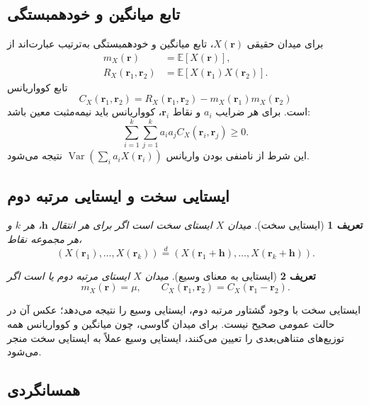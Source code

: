 \documentclass[12pt,openany,oneside]{book}
\newtheorem{definition}{تعریف}[chapter]
\newcommand{\E}{\mathbb{E}}
\newcommand{\Var}{\operatorname{Var}}
\newcommand{\vect}[1]{\bm{#1}}
\begin{document}
\subsection{تابع میانگین و خودهمبستگی}

برای میدان حقیقی \(X(\vect{r})\)، تابع میانگین و خودهمبستگی به‌ترتیب عبارت‌اند از
\begin{align}
 m_X(\vect{r})&=\E[X(\vect{r})],\\
 R_X(\vect{r}_1,\vect{r}_2)&=\E[X(\vect{r}_1)X(\vect{r}_2)].
\end{align}
تابع کوواریانس
\begin{equation}
 C_X(\vect{r}_1,\vect{r}_2)
 =R_X(\vect{r}_1,\vect{r}_2)-m_X(\vect{r}_1)m_X(\vect{r}_2)
\end{equation}
است. برای هر ضرایب \(a_i\) و نقاط \(\vect{r}_i\)، کوواریانس باید نیمه‌مثبت معین باشد:
\begin{equation}
\sum_{i=1}^{k}\sum_{j=1}^{k}a_i a_j C_X(\vect{r}_i,\vect{r}_j)\ge 0.
\end{equation}
این شرط از نامنفی بودن واریانس \(\Var(\sum_i a_iX(\vect{r}_i))\) نتیجه می‌شود.

\subsection{ایستایی سخت و ایستایی مرتبه دوم}

\begin{definition}[ایستایی سخت]
میدان \(X\) ایستای سخت است اگر برای هر انتقال \(\vect{h}\)، هر \(k\) و هر مجموعه نقاط،
\begin{equation}
(X(\vect{r}_1),\ldots,X(\vect{r}_k))
\overset{d}{=}
(X(\vect{r}_1+\vect{h}),\ldots,X(\vect{r}_k+\vect{h})).
\end{equation}
\end{definition}

\begin{definition}[ایستایی به معنای وسیع]
میدان \(X\) ایستای مرتبه دوم یا  است اگر
\begin{equation}
 m_X(\vect{r})=\mu,
 \qquad
 C_X(\vect{r}_1,\vect{r}_2)=C_X(\vect{r}_1-\vect{r}_2).
\end{equation}
\end{definition}

ایستایی سخت با وجود گشتاور مرتبه دوم، ایستایی وسیع را نتیجه می‌دهد؛ عکس آن در حالت عمومی صحیح نیست.
برای میدان گاوسی، چون میانگین و کوواریانس همه توزیع‌های متناهی‌بعدی را تعیین می‌کنند، ایستایی وسیع
عملاً به ایستایی سخت منجر می‌شود.

\subsection{همسانگردی}
\end{document}
